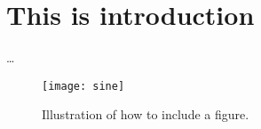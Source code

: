 \chapter{This is introduction}\label{ch:introduction}

\ldots

\instructionsintroduction

\begin{figure}
  \centering
  \medskip
  \texttt{[image: sine]}
  \caption{Illustration of how to include a figure. }
  \label{fig:sine}
\end{figure}



\cleardoublepage

